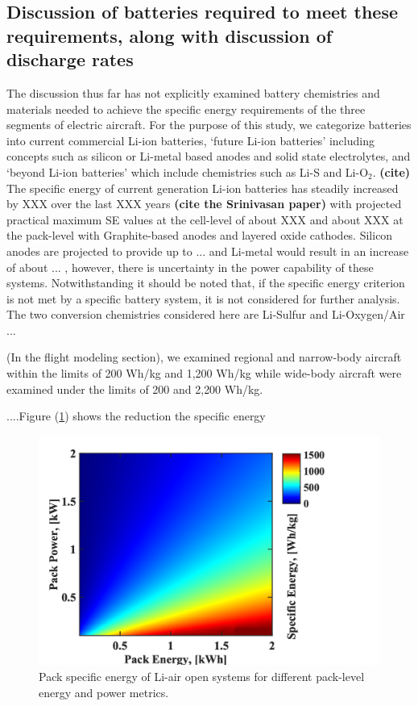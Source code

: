 \documentclass{achemso}
\newcommand{\abattention}[1]{{\textbf{\textcolor{Orange}{Alec: #1}}}}
\begin{document}
\subsection{Discussion of batteries required to meet these requirements, along with discussion of discharge rates}
The discussion thus far has not explicitly examined battery chemistries and materials needed to achieve the specific energy requirements of the three segments of electric aircraft.  For the purpose of this study, we categorize batteries into current commercial Li-ion batteries, `future Li-ion batteries' including concepts such as silicon or Li-metal based anodes and solid state electrolytes, and `beyond Li-ion batteries' which include chemistries such as Li-S and Li-O$\mathrm{_2}$. \textbf{(cite)} The specific energy of current generation Li-ion batteries has steadily increased by XXX over the last XXX years \textbf{(cite the Srinivasan paper)} with projected practical maximum SE values at the cell-level of about XXX and about XXX at the pack-level with Graphite-based anodes and layered oxide cathodes. Silicon anodes are projected to provide up to ... and Li-metal would result in an increase of about ... , however, there is uncertainty in the power capability of these systems. Notwithstanding it should be noted that, if the specific energy criterion is not met by a specific battery system, it is not considered for further analysis. The two conversion chemistries considered here are Li-Sulfur and Li-Oxygen/Air ...

(In the flight modeling section), we examined regional and narrow-body aircraft within the limits of 200 Wh/kg and 1,200 Wh/kg while wide-body aircraft were examined under the limits of 200 and 2,200 Wh/kg. 

....Figure (\ref{fig:ragone}) shows the reduction the specific energy

\begin{figure}[h!]
\centering
\includegraphics[width=0.6\linewidth]{ragone.png}
\caption{Pack specific energy of Li-air open systems for different pack-level energy and power metrics.}
\label{fig:ragone} 
\end{figure} 
\end{document}
